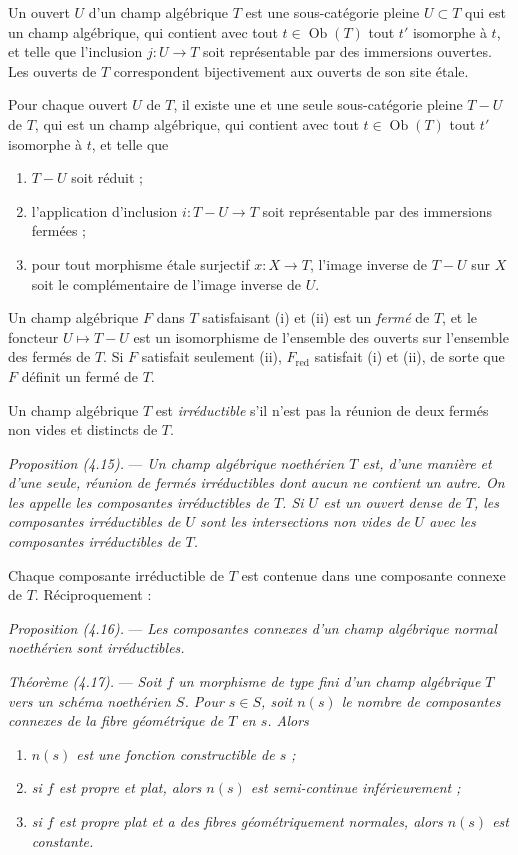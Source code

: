 \documentclass[10pt]{article}
\begin{document}
Un ouvert $U$ d'un champ algébrique $T$ est une sous-catégorie pleine $U\subset T$ qui est un champ algébrique, qui contient avec tout $t\in\operatorname{Ob}(T)$ tout $t'$ isomorphe à $t$, et telle que l'inclusion $j:U\to T$ soit représentable par des immersions ouvertes. Les ouverts de $T$ correspondent bijectivement aux ouverts de son site étale.

Pour chaque ouvert $U$ de $T$, il existe une et une seule sous-catégorie pleine $T-U$ de $T$, qui est un champ algébrique, qui contient avec tout $t\in\operatorname{Ob}(T)$ tout $t'$ isomorphe à $t$, et telle que
\begin{enumerate}[label=(\roman*)]
\item $T-U$ soit réduit ;
\item l'application d'inclusion $i:T-U\to T$ soit représentable par des immersions fermées ;
\item pour tout morphisme étale surjectif $x:X\to T$, l'image inverse de $T-U$ sur $X$ soit le complémentaire de l'image inverse de $U$.
\end{enumerate}

Un champ algébrique $F$ dans $T$ satisfaisant (i) et (ii) est un \emph{fermé} de $T$, et le foncteur $U\mapsto T-U$ est un isomorphisme de l'ensemble des ouverts sur l'ensemble des fermés de $T$. Si $F$ satisfait seulement (ii), $F_{\mathrm{red}}$ satisfait (i) et (ii), de sorte que $F$ définit un fermé de $T$.

Un champ algébrique $T$ est \emph{irréductible} s'il n'est pas la réunion de deux fermés non vides et distincts de $T$.

\medskip
\noindent\emph{Proposition (4.15).} --- \emph{Un champ algébrique noethérien $T$ est, d'une manière et d'une seule, réunion de fermés irréductibles dont aucun ne contient un autre. On les appelle les composantes irréductibles de $T$. Si $U$ est un ouvert dense de $T$, les composantes irréductibles de $U$ sont les intersections non vides de $U$ avec les composantes irréductibles de $T$.}

Chaque composante irréductible de $T$ est contenue dans une composante connexe de $T$. Réciproquement :

\medskip
\noindent\emph{Proposition (4.16).} --- \emph{Les composantes connexes d'un champ algébrique normal noethérien sont irréductibles.}

\medskip
\noindent\emph{Théorème (4.17).} --- \emph{Soit $f$ un morphisme de type fini d'un champ algébrique $T$ vers un schéma noethérien $S$. Pour $s\in S$, soit $n(s)$ le nombre de composantes connexes de la fibre géométrique de $T$ en $s$. Alors}
\begin{enumerate}[label=(\roman*)]
\item \emph{$n(s)$ est une fonction constructible de $s$ ;}
\item \emph{si $f$ est propre et plat, alors $n(s)$ est semi-continue inférieurement ;}
\item \emph{si $f$ est propre plat et a des fibres géométriquement normales, alors $n(s)$ est constante.}
\end{enumerate}
\end{document}
